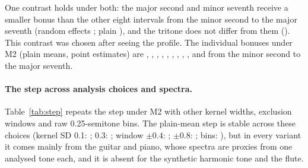 \documentclass[11pt,a4paper]{article}
\newcommand{\HK}{H\&K}
\begin{document}
One contrast holds under both: the major second and minor seventh receive a smaller bonus
than the other eight intervals from the minor second to the major seventh (random effects
\decTwoMMvsRest; plain \decTwoMMvsRestFixed), and the tritone does not differ from them
(\decTwoTTvsMM). This contrast was chosen after seeing the profile. The individual bonuses
under M2 (plain means, point estimates) are \decTwoBMinSec, \decTwoBMajSec, \decTwoBMinThird,
\decTwoBMajThird, \decTwoBFourth, \decTwoBTritone, \decTwoBFifth, \decTwoBMinSixth,
\decTwoBMajSixth, \decTwoBMinSev{} and \decTwoBMajSev{} from the minor second to the major
seventh.

\paragraph{The step across analysis choices and spectra.}
Table~\ref{tab:step} repeats the step under M2 with other kernel widths, exclusion windows
and raw 0.25-semitone bins. The plain-mean step is stable across these choices (kernel SD 0.1:
\srStepSdOne; 0.3: \srStepSdThree; window $\pm0.4$: \srStepWinFour; $\pm0.8$: \srStepWinEight;
bins: \srStepBin), but in every variant it comes mainly from the guitar and piano, whose
spectra are proxies from one analysed tone each, and it is absent for the synthetic harmonic
tone and the flute.

\begin{table}[h]
\centering
\caption{Decomposition of the held-out gap under three curves (exploratory). For each: plain
mean over the six harmonic spectra [participant-bootstrap CI] and random effects
[Hartung--Knapp CI]. M1: \HK{} + harmonicity (20 cents); M2: + interval size; M3: + sharpness
proxy. Bold: CI excludes zero.}
\label{tab:decompmodels}
\scriptsize
\setlength{\tabcolsep}{2pt}
\end{table}
\end{document}
